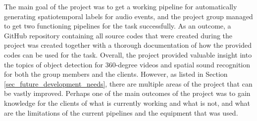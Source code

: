 The main goal of the project was to get a working pipeline for automatically generating spatiotemporal labels for audio events, and the project group managed to get two functioning pipelines for the task successfully. As an outcome, a GitHub repository containing all source codes that were created during the project was created together with a thorough documentation of how the provided codes can be used for the task. Overall, the project provided valuable insight into the topics of object detection for 360-degree videos and spatial sound recognition for both the group members and the clients. However, as listed in Section \ref{sec_future_development_needs}, there are multiple areas of the project that can be vastly improved. Perhaps one of the main outcomes of the project was to gain knowledge for the clients of what is currently working and what is not, and what are the limitations of the current pipelines and the equipment that was used.

